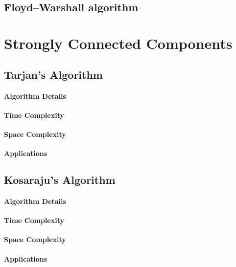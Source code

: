 \documentclass[12pt]{article}
\begin{document}


\subsection{Floyd–Warshall algorithm}

\section{Strongly Connected Components}

\subsection{Tarjan's Algorithm}



\paragraph{Algorithm Details}
\paragraph{Time Complexity}
\paragraph{Space Complexity}
\paragraph{Applications}

\subsection{Kosaraju's Algorithm}



\paragraph{Algorithm Details}
\paragraph{Time Complexity}
\paragraph{Space Complexity}
\paragraph{Applications}
\end{document}
